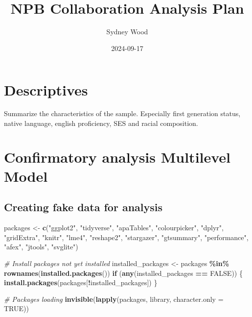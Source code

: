 \documentclass[
]{article}
\title{NPB Collaboration Analysis Plan}
\author{Sydney Wood}
\date{2024-09-17}
\newenvironment{Shaded}{\begin{snugshade}}{\end{snugshade}}
\newcommand{\AttributeTok}[1]{\textcolor[rgb]{0.13,0.29,0.53}{#1}}
\newcommand{\CommentTok}[1]{\textcolor[rgb]{0.56,0.35,0.01}{\textit{#1}}}
\newcommand{\ConstantTok}[1]{\textcolor[rgb]{0.56,0.35,0.01}{#1}}
\newcommand{\ControlFlowTok}[1]{\textcolor[rgb]{0.13,0.29,0.53}{\textbf{#1}}}
\newcommand{\FunctionTok}[1]{\textcolor[rgb]{0.13,0.29,0.53}{\textbf{#1}}}
\newcommand{\NormalTok}[1]{#1}
\newcommand{\OtherTok}[1]{\textcolor[rgb]{0.56,0.35,0.01}{#1}}
\newcommand{\SpecialCharTok}[1]{\textcolor[rgb]{0.81,0.36,0.00}{\textbf{#1}}}
\newcommand{\StringTok}[1]{\textcolor[rgb]{0.31,0.60,0.02}{#1}}
\begin{document}
\maketitle

\section{Descriptives}\label{descriptives}

Summarize the characteristics of the sample. Especially first generation
status, native language, english proficiency, SES and racial
composition.

\section{Confirmatory analysis Multilevel
Model}\label{confirmatory-analysis-multilevel-model}

\subsection{Creating fake data for
analysis}\label{creating-fake-data-for-analysis}

\begin{Shaded}
\begin{Highlighting}[]
\NormalTok{packages }\OtherTok{\textless{}{-}} \FunctionTok{c}\NormalTok{(}\StringTok{"ggplot2"}\NormalTok{,  }\StringTok{"tidyverse"}\NormalTok{, }\StringTok{"apaTables"}\NormalTok{, }\StringTok{"colourpicker"}\NormalTok{, }\StringTok{"dplyr"}\NormalTok{, }\StringTok{"gridExtra"}\NormalTok{, }\StringTok{"knitr"}\NormalTok{, }\StringTok{"lme4"}\NormalTok{, }\StringTok{"reshape2"}\NormalTok{, }\StringTok{"stargazer"}\NormalTok{, }\StringTok{"gtsummary"}\NormalTok{, }\StringTok{"performance"}\NormalTok{, }\StringTok{"afex"}\NormalTok{, }\StringTok{"jtools"}\NormalTok{, }\StringTok{"svglite"}\NormalTok{)}

\CommentTok{\# Install packages not yet installed}
\NormalTok{installed\_packages }\OtherTok{\textless{}{-}}\NormalTok{ packages }\SpecialCharTok{\%in\%} \FunctionTok{rownames}\NormalTok{(}\FunctionTok{installed.packages}\NormalTok{())}
\ControlFlowTok{if}\NormalTok{ (}\FunctionTok{any}\NormalTok{(installed\_packages }\SpecialCharTok{==} \ConstantTok{FALSE}\NormalTok{)) \{}
  \FunctionTok{install.packages}\NormalTok{(packages[}\SpecialCharTok{!}\NormalTok{installed\_packages])}
\NormalTok{\}}

\CommentTok{\# Packages loading}
\FunctionTok{invisible}\NormalTok{(}\FunctionTok{lapply}\NormalTok{(packages, library, }\AttributeTok{character.only =} \ConstantTok{TRUE}\NormalTok{))}
\end{Highlighting}
\end{Shaded}
\end{document}
